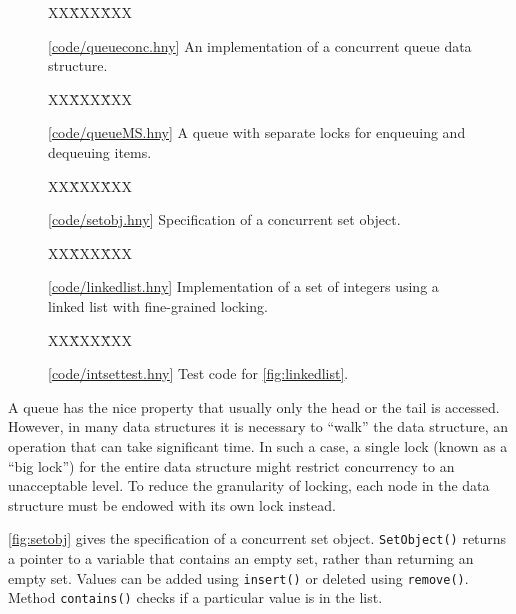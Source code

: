 \documentclass{report}
\newcommand{\harmonysource}[1]{
\begin{tabbing}
XX\=XXX\=XXX\kill
    
\end{tabbing}
}
\newcommand{\harmonylink}[1]{%
[\href{https://harmony.cs.cornell.edu/#1}{\underline{#1}}]%
}
\newenvironment{code}{
\tcolorbox
}{
\endtcolorbox
}
\begin{document}
\begin{figure}
\begin{code}
\harmonysource{queueconc}
\end{code}
\caption{\harmonylink{code/queueconc.hny} An implementation of a concurrent queue data structure.}
\label{fig:queueconc}
\end{figure}

\begin{figure}
\begin{code}
\harmonysource{queueMS}
\end{code}
\caption{\harmonylink{code/queueMS.hny} A queue with separate locks for enqueuing and dequeuing items.}
\label{fig:queueMS}
\end{figure}

\begin{figure}
\begin{code}
\harmonysource{setobj}
\end{code}
\caption{\harmonylink{code/setobj.hny} Specification of a concurrent
set object.}
\label{fig:setobj}
\end{figure}

\begin{figure}
\begin{code}
\harmonysource{linkedlist}
\end{code}
\caption{\harmonylink{code/linkedlist.hny} Implementation of a set of integers using a linked list with fine-grained locking.}
\label{fig:linkedlist}
\end{figure}

\begin{figure}
\begin{code}
\harmonysource{intsettest}
\end{code}
\caption{\harmonylink{code/intsettest.hny} Test code for \autoref{fig:linkedlist}.}
\label{fig:intsettest}
\end{figure}

%
%
%
%
A queue has the nice property that usually only the head or the tail is accessed.
However, in many data structures it is necessary to ``walk'' the data structure,
an operation that can take significant time.
In such a case, a single lock (known as a ``big lock'')
for the entire data structure might restrict concurrency to an unacceptable level.
To reduce the granularity of locking, each node in the data structure must be
endowed with its own lock instead.

\autoref{fig:setobj} gives the specification of a concurrent set object.
\texttt{SetObject()} returns a pointer to a variable that
contains an empty set, rather than returning an empty set.
Values can be added using \texttt{insert()} or deleted using \texttt{remove()}.
Method \texttt{contains()} checks if a particular value is in the list.
\end{document}
